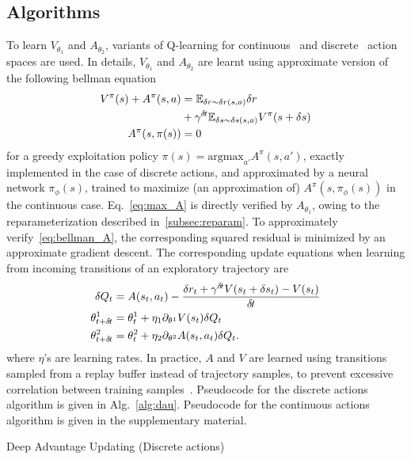 \subsection{Algorithms}
\label{subsec:algorithm}
To learn $V_{\theta_1}$ and $A_{\theta_2}$, variants of Q-learning for continuous~\cite{ddpg} and
discrete~\cite{dqn} action spaces are used. In details, $V_{\theta_1}$ and $A_{\theta_2}$ are learnt
using approximate version of the following bellman equation
\begin{align}
	V^{\pi}(s) + A^{\pi}(s, a) &= \mathbb{E}_{\delta r \sim \delta r(s, a)}\delta r\nonumber\\ 
				   &+ \gamma^{{\delta\hspace{-.1em}t}}  \mathbb{E}_{\delta s \sim \delta s(s, a)} V^{\pi}(s + \delta s)\label{eq:bellman_A}\\
	A^{\pi}(s, \pi(s)) &= 0\label{eq:max_A}
\end{align}
for a greedy exploitation policy $\pi(s) = \text{argmax}_{a'}A^\pi(s, a')$,
exactly implemented in the case of discrete actions, and approximated by a
neural network $\pi_\phi(s)$, trained to maximize (an approximation of)
$A^\pi(s, \pi_\phi(s))$ in the continuous case.  Eq.~\eqref{eq:max_A} is
directly verified by $A_{\theta_1}$, owing to the reparameterization described
in~\ref{subsec:reparam}.  To approximately verify~\eqref{eq:bellman_A}, the
corresponding squared residual is minimized by an approximate gradient descent.
The corresponding update equations when learning from incoming transitions of
an exploratory trajectory are
\begin{align}
	\delta Q_t &= A(s_t, a_t) - \frac{\delta r_t + \gamma^{{\delta\hspace{-.1em}t}} V(s_{t}+\delta s_{t}) - V(s_t)}{{\delta\hspace{-.1em}t}}\\
	\theta^1_{t+{\delta\hspace{-.1em}t}} &= \theta^1_t + \eta_1 \partial_{\theta^1} V(s_t) \delta Q_t\\
	\theta^2_{t+{\delta\hspace{-.1em}t}} &= \theta^2_t + \eta_2 \partial_{\theta^2} A(s_t, a_t) \delta Q_t.
	\label{eq:approx_bellman_A}
\end{align}
where $\eta$'s are learning rates. In practice, $A$ and $V$ are learned using
transitions sampled from a replay buffer instead of trajectory samples, to
prevent excessive correlation between training samples~\cite{dqn}. Pseudocode
for the discrete actions algorithm is given in Alg.~\ref{alg:dau}. Pseudocode
for the continuous actions algorithm is given in the supplementary material.
\begin{algorithm}[ht]
	\caption{Deep Advantage Updating (Discrete actions)}
	
	\label{alg:dau}
\end{algorithm}

